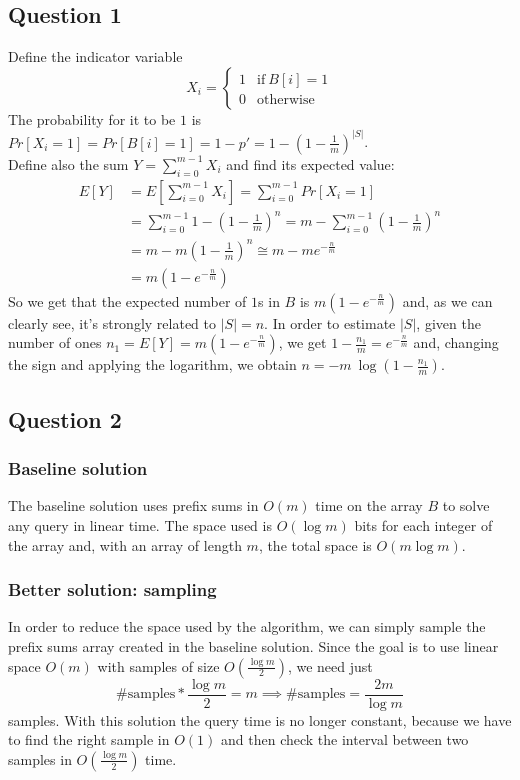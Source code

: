 \documentclass{article}
\begin{document}
\subsection{Question 1}
Define the indicator variable
$$
X_i=\begin{cases}
1 & \textrm{if}\ B[i]=1\\
0 & \textrm{otherwise}
\end{cases}
$$
The probability for it to be $1$ is $Pr[X_i=1]=Pr[B[i]=1]=1-p'=1-(1-\frac{1}{m})^{|S|}$.\\
Define also the sum $Y=\sum_{i=0}^{m-1} X_i$ and find its expected value:
\begin{align*}
E[Y]&=E\left[\sum_{i=0}^{m-1} X_i\right]=\sum_{i=0}^{m-1} Pr[X_i=1]\\
&=\sum_{i=0}^{m-1} 1-\left(1-\frac{1}{m}\right)^n = m-\sum_{i=0}^{m-1}\left(1-\frac{1}{m}\right)^n\\
&=m-m\left(1-\frac{1}{m}\right)^n \cong m-me^{-\frac{n}{m}}\\
&=m\left(1-e^{-\frac{n}{m}}\right)
\end{align*}
So we get that the expected number of $1$s in $B$ is $m(1-e^{-\frac{n}{m}})$ and, as we can clearly see, it's strongly related to $|S|=n$. 
In order to estimate $|S|$, given the number of ones $n_1=E[Y]=m(1-e^{-\frac{n}{m}})$, we get $1-\frac{n_1}{m}=e^{-\frac{n}{m}}$ and, changing the sign and applying the logarithm, we obtain $n=-m\ \log(1-\frac{n_1}{m})$.

\subsection{Question 2}
\subsubsection{Baseline solution}
The baseline solution uses prefix sums in $O(m)$ time on the array $B$ to solve any query in linear time.
The space used is $O(\log m)$ bits for each integer of the array and, with an array of length $m$, the total space is $O(m\log m)$.

\subsubsection{Better solution: sampling}
In order to reduce the space used by the algorithm, we can simply sample the prefix sums array created in the baseline solution. Since the goal is to use linear space $O(m)$ with samples of size $O(\frac{\log m}{2})$, we need just $$\textrm{\# samples}*\frac{\log m}{2}=m \implies \textrm{\# samples}=\frac{2m}{\log m}$$ samples. With this solution the query time is no longer constant, because we have to find the right sample in $O(1)$ and then check the interval between two samples in $O(\frac{\log m}{2})$ time.
\end{document}
